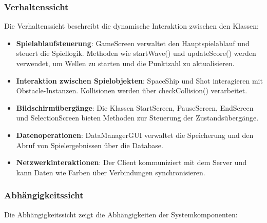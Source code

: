 \documentclass[10pt]{article}
\begin{document}

\newpage
\subsubsection{Verhaltenssicht}

Die Verhaltenssicht beschreibt die dynamische Interaktion zwischen den Klassen:

\begin{itemize}
    \item \textbf{Spielablaufsteuerung}: GameScreen verwaltet den Hauptspielablauf und steuert die Spiellogik. Methoden wie startWave() und updateScore() werden verwendet, um Wellen zu starten und die Punktzahl zu aktualisieren.

    \item \textbf{Interaktion zwischen Spielobjekten}: SpaceShip und Shot interagieren mit Obstacle-Instanzen. Kollisionen werden über checkCollision() verarbeitet.

    \item \textbf{Bildschirmübergänge}: Die Klassen StartScreen, PauseScreen, EndScreen und SelectionScreen bieten Methoden zur Steuerung der Zustandsübergänge.

    \item \textbf{Datenoperationen}: DataManagerGUI verwaltet die Speicherung und den Abruf von Spielergebnissen über die Database.

    \item \textbf{Netzwerkinteraktionen}: Der Client kommuniziert mit dem Server und kann Daten wie Farben über Verbindungen synchronisieren.
\end{itemize}

\subsubsection{Abhängigkeitssicht}

Die Abhängigkeitssicht zeigt die Abhängigkeiten der Systemkomponenten:
\end{document}
